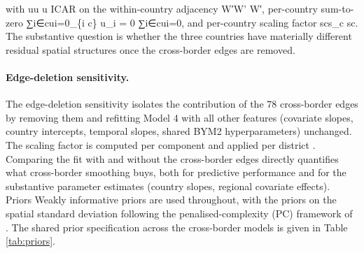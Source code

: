 \documentclass{article}
\begin{document}
with uu u ICAR on the within-country adjacency W′W' W′, per-country
sum-to-zero ∑i∈cui=0\sum\_\{i \in c\} u\_i = 0
∑i∈c\hspace{0pt}ui\hspace{0pt}=0, and per-country scaling factor scs\_c
sc\hspace{0pt}. The substantive question is whether the three countries
have materially different residual spatial structures once the
cross-border edges are removed.

\paragraph{Edge-deletion sensitivity.}

The edge-deletion sensitivity isolates the contribution of the 78
cross-border edges by removing them and refitting Model 4 with all other
features (covariate slopes, country intercepts, temporal slopes, shared
BYM2 hyperparameters) unchanged. The scaling factor is computed per
component and applied per district \citep{freni2018}. Comparing the fit
with and without the cross-border edges directly quantifies what
cross-border smoothing buys, both for predictive performance and for the
substantive parameter estimates (country slopes, regional covariate
effects). Priors \label{sec:priors} Weakly informative priors are used
throughout, with the priors on the spatial standard deviation following
the penalised-complexity (PC) framework of \citep{simpson2017}. The
shared prior specification across the cross-border models is given in
Table \ref{tab:priors}.
\end{document}

